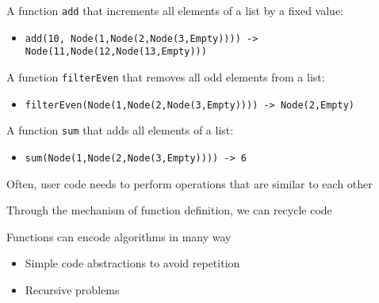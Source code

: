 \documentclass{beamer}
\begin{document}
\begin{slide}{
\item A function \texttt{add} that increments all elements of a list by a fixed value:
\begin{itemize}
\item \texttt{add(10, Node(1,Node(2,Node(3,Empty)))) -> Node(11,Node(12,Node(13,Empty)))}
\end{itemize}
\item A function \texttt{filterEven} that removes all odd elements from a list:
\begin{itemize}
\item \texttt{filterEven(Node(1,Node(2,Node(3,Empty)))) -> Node(2,Empty)}
\end{itemize}
\item A function \texttt{sum} that adds all elements of a list:
\begin{itemize}
\item \texttt{sum(Node(1,Node(2,Node(3,Empty)))) -> 6}
\end{itemize}
}\end{slide}

\begin{slide}{
\item Often, user code needs to perform operations that are similar to each other
\item Through the mechanism of function definition, we can recycle code
\item Functions can encode algorithms in many way
\begin{itemize}
\item Simple code abstractions to avoid repetition
\item Recursive problems
\end{itemize}
}\end{slide}

\begin{thankyou}
\end{thankyou}
\end{document}

